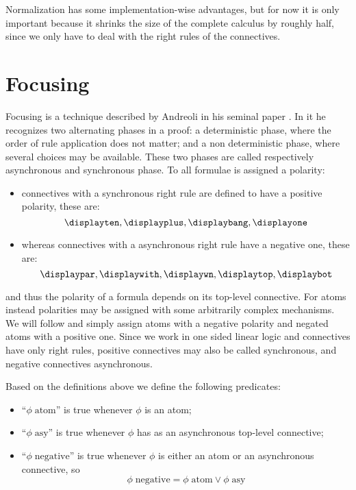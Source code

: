 Normalization has some implementation-wise advantages, but for now it is only important because it shrinks the size of the complete calculus by roughly half, since we only have to deal with the right rules of the connectives.

\section{Focusing}
Focusing is a technique described by Andreoli in his seminal paper \cite{Focusing}.
In it he recognizes two alternating phases in a proof: a deterministic phase, where the order of rule application does not matter; and a non deterministic phase, where several choices may be available.
These two phases are called respectively asynchronous and synchronous phase.
To all formulae is assigned a polarity: 		%
\begin{itemize}
	\item connectives with a synchronous right rule are defined to have a positive polarity, these are:
		$$ \displayten, \displayplus, \displaybang, \displayone$$
	\item whereas connectives with a asynchronous right rule have a negative one, these are:
		$$ \displaypar, \displaywith, \displaywn, \displaytop, \displaybot$$
\end{itemize}
and thus the polarity of a formula depends on its top-level connective.
For atoms instead polarities may be assigned with some arbitrarily complex mechanisms.
We will follow \cite{LiangMiller} and simply assign atoms with a negative polarity and negated atoms with a positive one.
Since we work in one sided linear logic and connectives have only right rules, positive connectives may also be called synchronous, and negative connectives asynchronous.
\begin{define}\label{def:focusing predicates}
	Based on the definitions above we define the following predicates:
	\begin{itemize}
		\item ``$\phi \; \mathrm{atom}$'' is true whenever $\phi$ is an atom;
		\item ``$\phi \; \mathrm{asy}$'' is true whenever $\phi$ has as an asynchronous top-level connective;
		\item ``$\phi \; \mathrm{negative}$'' is true whenever $\phi$ is either an atom or an asynchronous connective, so
			$$ \phi \; \mathrm{negative} = \phi \; \mathrm{atom} \vee \phi \; \mathrm{asy} $$
	\end{itemize}
\end{define}

